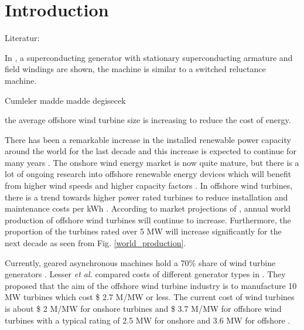 \documentclass[12pt]{iopart}
\begin{document}
\maketitle

\section{Introduction}


Literatur:

In \cite{Chen2014}, a superconducting generator with stationary superconducting armature and field windings are shown, the machine is similar to a switched reluctance machine.

Cumleler madde madde degisecek

the average offshore wind turbine size is increasing to reduce the cost of energy.


There has been a remarkable increase in the installed renewable power capacity around the world for the last decade and this increase is expected to continue for many years \cite{Tong2010}. The onshore wind energy market is now quite mature, but there is a lot of ongoing research into offshore renewable energy devices which will benefit from higher wind speeds and higher capacity factors \cite{Tong2010}.  In offshore wind turbines, there is a trend towards higher power rated turbines to reduce installation and maintenance costs per kWh \cite{Bang2008}. According to market projections of \cite{offshore_wind_report2009}, annual world production of offshore wind turbines will continue to increase. Furthermore, the proportion of  the turbines rated over 5 MW will increase significantly for the next decade as seen from Fig. \ref{world_production}.

Currently, geared asynchronous machines hold a 70\% share of wind turbine generators \cite{Lesser2009}. Lesser \textit{et al.} compared costs of different generator types in \cite{Lesser2009}. They proposed that the aim of the offshore wind turbine industry is to manufacture 10 MW  turbines which cost \$ 2.7 M/MW or less. The current cost of wind turbines is about \$ 2 M/MW for onshore turbines and \$ 3.7 M/MW for offshore wind turbines with a typical rating of 2.5 MW for onshore and 3.6 MW for offshore \cite{Lesser2009}.
\end{document}
